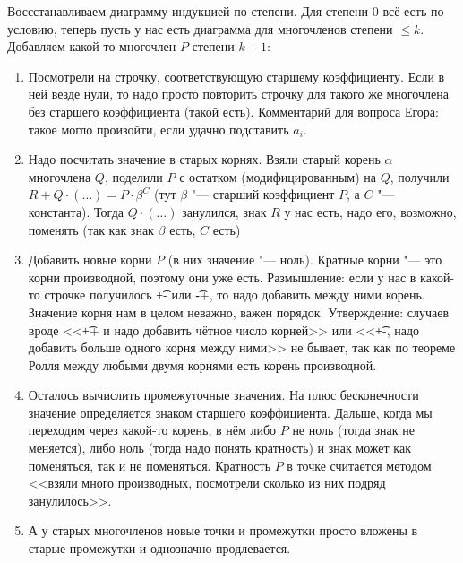 	Воссстанавливаем диаграмму индукцией по степени.
	Для степени $0$ всё есть по условию, теперь пусть у нас есть диаграмма для многочленов степени $\le k$.
	Добавляем какой-то многочлен $P$ степени $k+1$:
	\begin{enumerate}
	\item
		Посмотрели на строчку, соответствующую старшему коэффициенту.
		Если в ней везде нули, то надо просто повторить строчку для такого же многочлена без старшего коэффициента (такой есть).
		Комментарий для вопроса Егора: такое могло произойти, если удачно подставить $a_i$.
	\item
		Надо посчитать значение в старых корнях.
		Взяли старый корень $\alpha$ многочлена $Q$, поделили $P$ с остатком (модифицированным) на $Q$,
		получили $R+Q\cdot (\dots)=P\cdot \beta^C$ (тут $\beta$ "--- старший коэффициент $P$, а $C$ "--- константа).
		Тогда $Q\cdot (\dots)$ занулился, знак $R$ у нас есть, надо его, возможно, поменять (так как знак $\beta$ есть, $C$ есть)
	\item
		Добавить новые корни $P$ (в них значение "--- ноль).
		Кратные корни "--- это корни производной, поэтому они уже есть.
		Размышление: если у нас в какой-то строчке получилось \t{+-} или \t{-+}, то надо добавить между ними корень.
		Значение корня нам в целом неважно, важен порядок.
		Утверждение: случаев вроде <<\t{++} и надо добавить чётное число корней>> или <<\t{+-}, надо добавить больше одного корня между ними>> не бывает,
		так как по теореме Ролля между любыми двумя корнями есть корень производной.
	\item
		Осталось вычислить промежуточные значения.
		На плюс бесконечности значение определяется знаком старшего коэффициента.
		Дальше, когда мы переходим через какой-то корень, в нём либо $P$ не ноль (тогда знак не меняется),
		либо ноль (тогда надо понять кратность) и знак может как поменяться, так и не поменяться.
		Кратность $P$ в точке считается методом <<взяли много производных, посмотрели сколько из них подряд занулилось>>.
	\item
		А у старых многочленов новые точки и промежутки просто вложены в старые промежутки и однозначно продлевается.
	\end{enumerate}
